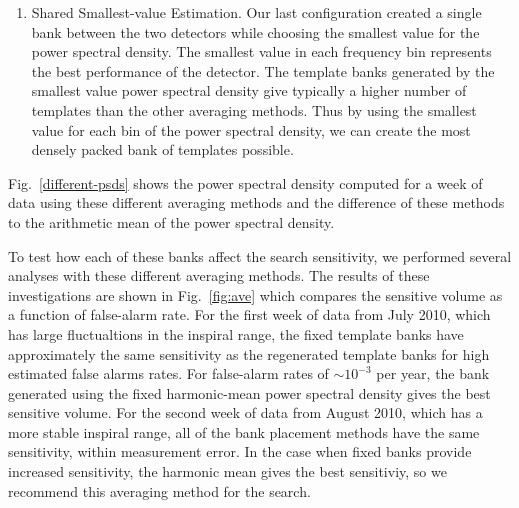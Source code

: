 \documentclass[12pt]{iopart} \usepackage{graphicx,amssymb}
\begin{document}
\begin{enumerate}
\item Shared Smallest-value Estimation.
Our last configuration created a single bank between the two detectors while
choosing the smallest value for the power spectral density. 
The smallest value in each frequency bin represents the best performance of the detector.
The template banks generated by the smallest value power spectral density give
typically a higher number of templates than the other averaging methods.
 Thus by using the smallest value for
each bin of the power spectral density, we can create the most densely packed
bank of templates possible.
\end{enumerate}
Fig.~\ref{different-psds} shows the power spectral density computed for a week of data using
these different averaging methods and the difference of these methods to the
arithmetic mean of the power spectral density.

To test how each of these banks affect the search sensitivity, we performed
several analyses with these different averaging methods.
The results of these investigations are shown in
Fig.~\ref{fig:ave} which compares the sensitive volume as a function of
false-alarm rate. For the first week of data from July 2010, which has large
fluctualtions in the inspiral range, the fixed
template banks have approximately the same sensitivity as the regenerated
template banks for high estimated false alarms rates. For false-alarm rates
of $\sim 10^{-3}$ per year, the bank generated using the fixed harmonic-mean
power spectral density gives the best sensitive volume.
For the second week of data from August 2010, which has a more stable
inspiral range, all of the bank placement methods have the same sensitivity,
within measurement error. In the case when fixed banks provide increased
sensitivity, the harmonic mean gives the best sensitiviy, so we recommend this
averaging method for the search.
\end{document}
